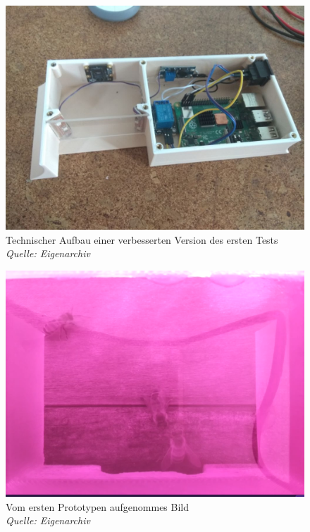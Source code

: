 \documentclass[11pt,a4paper]{article}
\begin{document}
\begin{figure}[H] \label{fig:first-generation-3}
    \centering
    \includegraphics[width=.8\textwidth]{images/second_prototype.jpg}
    \caption{Technischer Aufbau einer verbesserten Version des ersten Tests \\
    \textit{Quelle: Eigenarchiv}}
\end{figure}

\begin{figure}[H] \label{fig:first-generation-result}
    \centering
    \includegraphics[width=.8\textwidth]{images/results_first_prototype.png}
    \caption{Vom ersten Prototypen aufgenommes Bild\\
    \textit{Quelle: Eigenarchiv}}
\end{figure}
\end{document}
